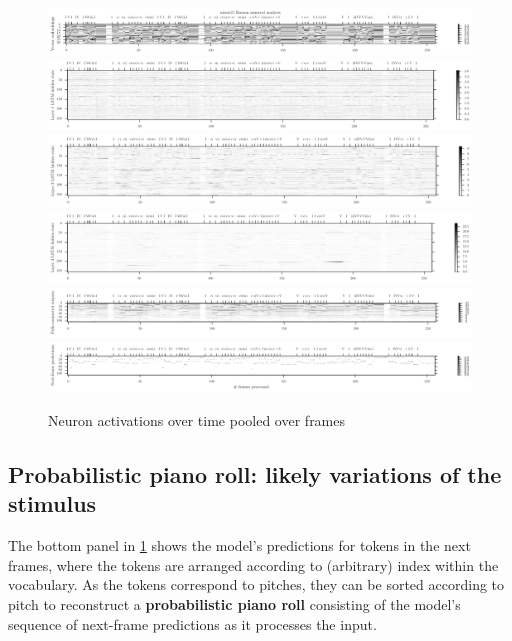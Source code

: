 \begin{figure}[htpb]
    \centering
    \includegraphics[width=1.0\linewidth]{model-analysis-chords-0.pdf}
    \includegraphics[width=1.0\linewidth]{model-analysis-chords-1.pdf}
    \includegraphics[width=1.0\linewidth]{model-analysis-chords-2.pdf}
    \includegraphics[width=1.0\linewidth]{model-analysis-chords-3.pdf}
    \includegraphics[width=1.0\linewidth]{model-analysis-chords-4.pdf}
    \includegraphics[width=1.0\linewidth]{model-analysis-chords-5.pdf}
    \caption{Neuron activations over time pooled over frames}
    \label{fig:model-analysis-frames}
\end{figure}

\subsection{Probabilistic piano roll: likely variations of the stimulus}

The bottom panel in \cref{fig:model-analysis-frames} shows the model's predictions
for tokens in the next frames, where the tokens are arranged according to (arbitrary)
index within the vocabulary. As the tokens correspond to pitches, they can be sorted
according to pitch to reconstruct a {\bf probabilistic piano roll}\citep{eck2008learning}
consisting of the model's sequence of next-frame predictions as it processes the input.


